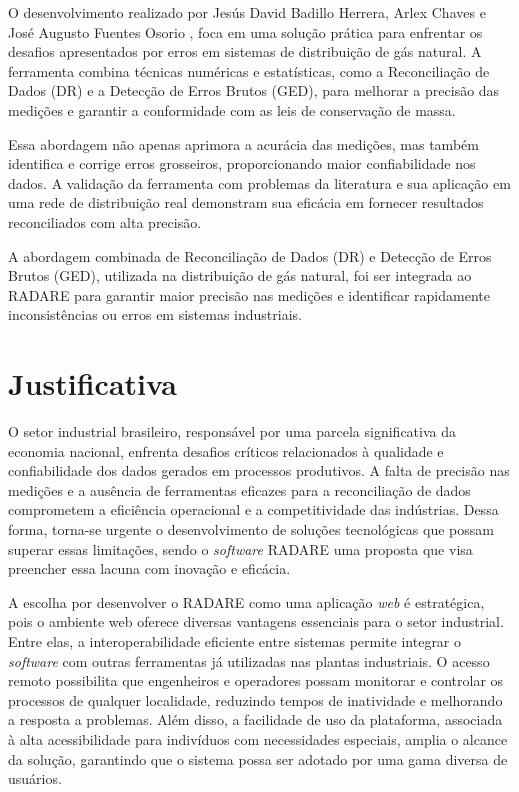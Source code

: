 O desenvolvimento realizado por Jesús David Badillo Herrera, Arlex Chaves e José Augusto Fuentes Osorio \cite{balancecontrol}, foca em uma solução prática para enfrentar os desafios apresentados por erros em sistemas de distribuição de gás natural. A ferramenta combina técnicas numéricas e estatísticas, como a Reconciliação de Dados (DR) e a Detecção de Erros Brutos (GED), para melhorar a precisão das medições e garantir a conformidade com as leis de conservação de massa.

Essa abordagem não apenas aprimora a acurácia das medições, mas também identifica e corrige erros grosseiros, proporcionando maior confiabilidade nos dados. A validação da ferramenta com problemas da literatura e sua aplicação em uma rede de distribuição real demonstram sua eficácia em fornecer resultados reconciliados com alta precisão.

A abordagem combinada de Reconciliação de Dados (DR) e Detecção de Erros Brutos (GED), utilizada na distribuição de gás natural, foi ser integrada ao RADARE para garantir maior precisão nas medições e identificar rapidamente inconsistências ou erros em sistemas industriais.


\section{Justificativa}

O setor industrial brasileiro, responsável por uma parcela significativa da economia nacional, enfrenta desafios críticos relacionados à qualidade e confiabilidade dos dados gerados em processos produtivos. A falta de precisão nas medições e a ausência de ferramentas eficazes para a reconciliação de dados comprometem a eficiência operacional e a competitividade das indústrias. Dessa forma, torna-se urgente o desenvolvimento de soluções tecnológicas que possam superar essas limitações, sendo o \textit{software} RADARE uma proposta que visa preencher essa lacuna com inovação e eficácia.

A escolha por desenvolver o RADARE como uma aplicação \textit{web} é estratégica, pois o ambiente web oferece diversas vantagens essenciais para o setor industrial. Entre elas, a interoperabilidade eficiente entre sistemas permite integrar o \textit{software} com outras ferramentas já utilizadas nas plantas industriais. O acesso remoto possibilita que engenheiros e operadores possam monitorar e controlar os processos de qualquer localidade, reduzindo tempos de inatividade e melhorando a resposta a problemas. Além disso, a facilidade de uso da plataforma, associada à alta acessibilidade para indivíduos com necessidades especiais, amplia o alcance da solução, garantindo que o sistema possa ser adotado por uma gama diversa de usuários.

